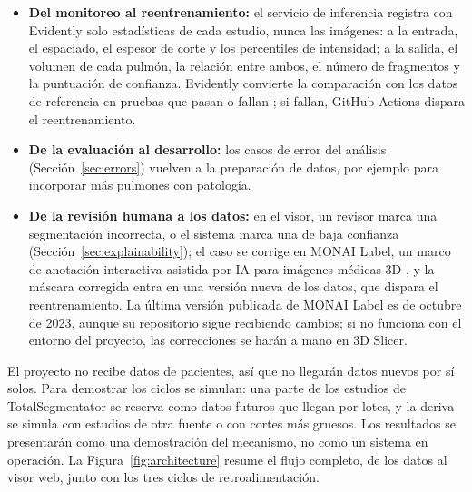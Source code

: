 \begin{itemize}
    \item \textbf{Del monitoreo al reentrenamiento:} el servicio de inferencia
          registra con Evidently solo estadísticas de cada estudio, nunca las
          imágenes: a la entrada, el espaciado, el espesor de corte y los
          percentiles de intensidad; a la salida, el volumen de cada pulmón,
          la relación entre ambos, el número de fragmentos y la puntuación de
          confianza. Evidently
          convierte la comparación con los datos de referencia en pruebas que
          pasan o fallan \parencite{evidently}; si fallan, GitHub Actions
          dispara el reentrenamiento.
    \item \textbf{De la evaluación al desarrollo:} los casos de error del
          análisis (Sección~\ref{sec:errors}) vuelven a la preparación de
          datos, por ejemplo para incorporar más pulmones con patología.
    \item \textbf{De la revisión humana a los datos:} en el visor, un revisor
          marca una segmentación incorrecta, o el sistema marca una de baja
          confianza (Sección~\ref{sec:explainability}); el caso se corrige en
          MONAI
          Label, un marco de anotación interactiva asistida por IA para
          imágenes médicas 3D \parencite{diazpinto2024}, y la máscara
          corregida entra en una versión nueva de los datos, que dispara el
          reentrenamiento. La última versión publicada de MONAI Label es de
          octubre de 2023, aunque su repositorio sigue recibiendo cambios; si
          no funciona con el entorno del proyecto, las correcciones se harán a
          mano en 3D Slicer.
\end{itemize}

El proyecto no recibe datos de pacientes, así que no llegarán datos nuevos por
sí solos. Para demostrar los ciclos se simulan: una parte de los estudios de
TotalSegmentator se reserva como datos futuros que llegan por lotes, y la
deriva se simula con estudios de otra fuente o con cortes más gruesos. Los
resultados se presentarán como una demostración del mecanismo, no como un
sistema en operación. La Figura~\ref{fig:architecture} resume el flujo
completo, de los datos al visor web, junto con los tres ciclos de
retroalimentación.


